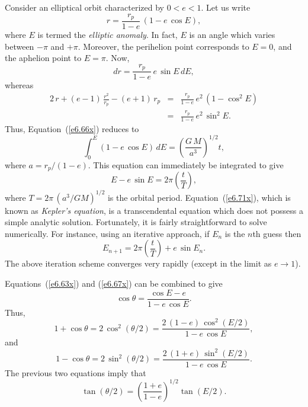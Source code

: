 Consider an elliptical orbit characterized by $0<e < 1$. Let us write
\begin{equation}\label{e6.67x}
r = \frac{r_p}{1-e}\,(1-e\,\cos E),
\end{equation}
where $E$ is termed the {\em elliptic anomaly}. In fact, $E$ is an angle which
varies between $-\pi$ and $+\pi$. Moreover, the perihelion point corresponds to
$E=0$, and the aphelion point to $E=\pi$. Now,
\begin{equation}
dr = \frac{r_p}{1-e}\,e\,\sin E\,dE,
\end{equation}
whereas
\begin{eqnarray}
2\,r + (e-1)\,\frac{r^2}{r_p}- (e+1)\,r_p &=& \frac{r_p}{1-e}\,e^2\,(1-\cos^2 E)\nonumber\\[0.5ex]
& =& \frac{r_p}{1-e}\,e^2\,\sin^2E.
\end{eqnarray}
Thus, Equation~(\ref{e6.66x}) reduces to
\begin{equation}
\int_0^E (1-e\,\cos E)\,dE = \left(\frac{G\,M}{a^3}\right)^{1/2} t,
\end{equation}
where $a = r_p/(1-e)$. This equation can immediately be integrated to give
\begin{equation}\label{e6.71x}
E - e\,\sin E = 2\pi\left(\frac{t}{T}\right),
\end{equation}
where
$T= 2\pi\,(a^3/GM)^{1/2}$ is the orbital period. Equation~(\ref{e6.71x}),
which  is known as {\em Kepler's equation},  is a transcendental equation 
which does not possess a simple analytic solution. Fortunately, it is fairly  straightforward to
solve numerically. For instance, using an iterative approach,
if $E_n$ is the $n$th guess then
\begin{equation}
E_{n+1} = 2\pi\left(\frac{t}{T}\right) + e\,\sin E_n.
\end{equation}
The above iteration scheme  converges very rapidly (except in the limit
as $e\rightarrow 1$). 

Equations~(\ref{e6.63x}) and (\ref{e6.67x}) can be combined
to give
\begin{equation}
\cos\theta = \frac{\cos E - e}{1-e\,\cos E}.
\end{equation}
Thus,
\begin{equation}
1+\cos\theta = 2\,\cos^2(\theta/2) = \frac{2\,(1-e)\,\cos^2( E/2)}{1-e\,\cos E},
\end{equation}
and
\begin{equation}
1-\cos\theta = 2\,\sin^2(\theta/2) = \frac{2\,(1+e)\,\sin^2 (E/2)}{1-e\,\cos E}.
\end{equation}
The previous two equations imply that
\begin{equation}
\tan (\theta/2) = \left(\frac{1+e}{1-e}\right)^{1/2}\tan (E/2).
\end{equation}

